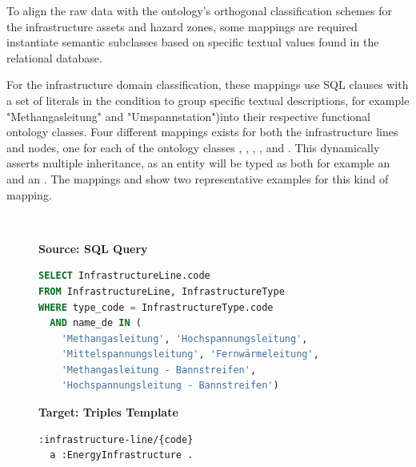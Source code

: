 To align the raw data with the ontology's orthogonal classification schemes for the infrastructure assets and hazard zones, some mappings are required instantiate semantic subclasses based on specific textual values found in the relational database.

For the infrastructure domain classification, these mappings use SQL  clauses with a set of literals in the  condition to group specific textual descriptions, for example "Methangasleitung" and "Umspannstation")into their respective functional ontology classes. Four different mappings exists for both the infrastructure lines and nodes, one for each of the ontology classes , , , , and . This dynamically asserts multiple inheritance, as an entity will be typed as both for example an  and an . The mappings  and  show two representative examples for this kind of mapping.

\begin{figure}[ht!]
  \vspace*{-1mm}
  \textbf{\small{}} \\
  \begin{minipage}[t]{0.50\textwidth}
    \centering
    \textbf{\scriptsize Source: SQL Query}
\begin{lstlisting}[language=SQL]
SELECT InfrastructureLine.code
FROM InfrastructureLine, InfrastructureType
WHERE type_code = InfrastructureType.code
  AND name_de IN (
    'Methangasleitung', 'Hochspannungsleitung',
    'Mittelspannungsleitung', 'Fernwärmeleitung',
    'Methangasleitung - Bannstreifen',
    'Hochspannungsleitung - Bannstreifen')
\end{lstlisting}
  \end{minipage}
  \hfill
  \begin{minipage}[t]{0.50\textwidth}
    \centering
    \textbf{\scriptsize Target: Triples Template}
\begin{lstlisting}[language=Turtle]
:infrastructure-line/{code}
  a :EnergyInfrastructure . 
\end{lstlisting}
  \end{minipage}
  \vspace*{-4mm}
\end{figure}

